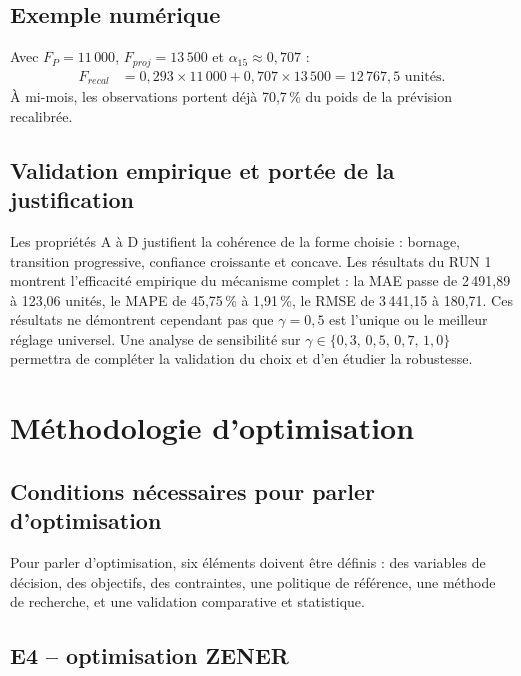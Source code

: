 \documentclass[11pt,a4paper]{article}
\begin{document}
\subsection{Exemple numérique}

Avec $F_P=11\,000$, $F_{proj}=13\,500$ et $\alpha_{15}\approx0{,}707$ :
\begin{align*}
F_{recal} &= 0{,}293\times 11\,000 + 0{,}707\times 13\,500 = 12\,767{,}5 \text{ unités.}
\end{align*}
À mi-mois, les observations portent déjà 70,7\,\% du poids de la prévision recalibrée.

\subsection{Validation empirique et portée de la justification}

Les propriétés A à D justifient la cohérence de la forme choisie : bornage, transition progressive, confiance croissante et concave. Les résultats du RUN 1 montrent l'efficacité empirique du mécanisme complet : la MAE passe de 2\,491,89 à 123,06 unités, le MAPE de 45,75\,\% à 1,91\,\%, le RMSE de 3\,441,15 à 180,71. Ces résultats ne démontrent cependant pas que $\gamma=0{,}5$ est l'unique ou le meilleur réglage universel. Une analyse de sensibilité sur $\gamma\in\{0{,}3,\,0{,}5,\,0{,}7,\,1{,}0\}$ permettra de compléter la validation du choix et d'en étudier la robustesse.

\section{Méthodologie d'optimisation}

\subsection{Conditions nécessaires pour parler d'optimisation}

Pour parler d'optimisation, six éléments doivent être définis : des variables de décision, des objectifs, des contraintes, une politique de référence, une méthode de recherche, et une validation comparative et statistique.

\subsection{E4 -- optimisation ZENER}
\end{document}
